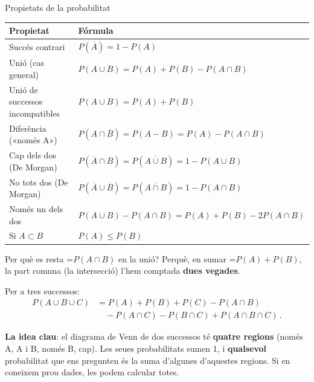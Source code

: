 \documentclass[11pt,a4paper]{article}
\newcommand{\fmm}[1]{\setbox0=\hbox{$#1$}\ifdim\wd0>\linewidth\fmdisp{#1}\else\mbox{\box0}\fi}
\newcommand{\fmdisp}[1]{\[\setbox2=\hbox{$\displaystyle #1$}\ifdim\wd2>\linewidth\resizebox{\linewidth}{!}{\box2}\else\box2\fi\]}
\newcommand{\fmuline}[1]{\textbf{\color{fmaccent}#1}}
\begin{document}
\begin{fmprop}{Propietats de la probabilitat}
\begin{center}\renewcommand{\arraystretch}{1.5}\small\begin{tabularx}{\linewidth}{>{\raggedright\arraybackslash}p{5.2cm}>{\raggedright\arraybackslash}X}\toprule
\textbf{Propietat} & \textbf{Fórmula}\\\midrule
Succés contrari & $P(\overline{A})=1-P(A)$\\[3pt]
Unió (cas general) & $P(A\cup B)=P(A)+P(B)-P(A\cap B)$\\[3pt]
Unió de successos incompatibles & $P(A\cup B)=P(A)+P(B)$\\[3pt]
Diferència («només A») & $P(A\cap\overline{B})=P(A-B)=P(A)-P(A\cap B)$\\[3pt]
Cap dels dos (De Morgan) & $P(\overline{A}\cap\overline{B})=P(\overline{A\cup B})=1-P(A\cup B)$\\[3pt]
No tots dos (De Morgan) & $P(\overline{A}\cup\overline{B})=P(\overline{A\cap B})=1-P(A\cap B)$\\[3pt]
Només un dels dos & $P(A\cup B)-P(A\cap B)=P(A)+P(B)-2P(A\cap B)$\\[3pt]
Si $A\subset B$ & $P(A)\leq P(B)$\\[3pt]
\bottomrule\end{tabularx}\end{center}

Per què es resta \fmm{P(A\cap B)} en la unió? Perquè, en sumar \fmm{P(A)+P(B)}, la part comuna (la intersecció) l'hem comptada \textbf{dues vegades}.

Per a tres successos: 
\[\begin{aligned}P(A\cup B\cup C)&=P(A)+P(B)+P(C)-P(A\cap B)\\&\quad-P(A\cap C)-P(B\cap C)+P(A\cap B\cap C)\,.\end{aligned}\]


\begin{fmnote}\fmuline{La idea clau}: el diagrama de Venn de dos successos té \textbf{quatre regions} (només A, A i B, només B, cap). Les seues probabilitats sumen 1, i \textbf{qualsevol} probabilitat que ens pregunten és la suma d'algunes d'aquestes regions. Si en coneixem prou dades, les podem calcular totes.\end{fmnote}
\end{fmprop}
\end{document}
